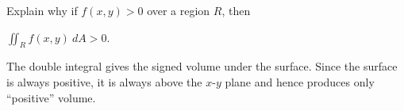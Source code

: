 {Explain why if $f(x,y)>0$ over a region $R$, then\par $\iint_Rf(x,y)\ dA>0$.
}
{The double integral gives the signed volume under the surface. Since the surface is always positive, it is always above the $x$-$y$ plane and hence produces only ``positive'' volume.
}
